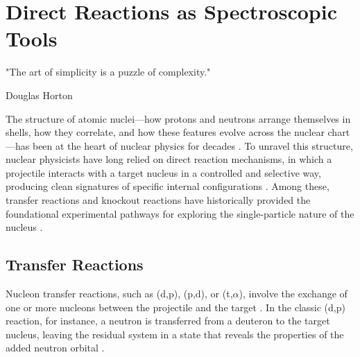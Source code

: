 
%

\chapter{Direct Reactions as Spectroscopic Tools}
\label{cha:reactions}


\epigraph{
	"The art of simplicity is a puzzle of complexity."
}{Douglas Horton}



\label{sec:introduction}

The structure of atomic nuclei—how protons and neutrons arrange themselves in shells, how they correlate, and how these features evolve across the nuclear chart—has been at the heart of nuclear physics for decades \cite{otsuka_evolution_2020}. To unravel this structure, nuclear physicists have long relied on direct reaction mechanisms, in which a projectile interacts with a target nucleus in a controlled and selective way, producing clean signatures of specific internal configurations \cite{casten_study_2000}. Among these, transfer reactions and knockout reactions have historically provided the foundational experimental pathways for exploring the single-particle nature of the nucleus \cite{casten_study_2000}.


\section{Transfer Reactions}
\label{sec:transfer_reactions}

Nucleon transfer reactions, such as (d,p), (p,d), or (t,$\alpha$), involve the exchange of one or more nucleons between the projectile and the target \cite{gade_reduction_2008, otsuka_evolution_2020}. In the classic (d,p) reaction, for instance, a neutron is transferred from a deuteron to the target nucleus, leaving the residual system in a state that reveals the properties of the added neutron orbital \cite{otsuka_evolution_2020}.

